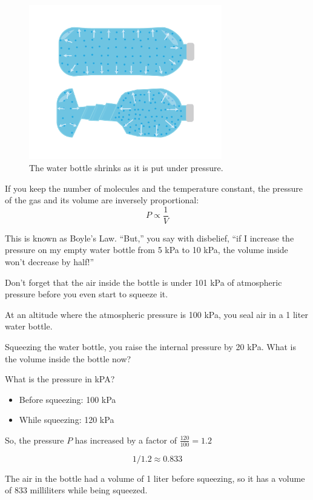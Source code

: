\begin{figure}[htbp]
    \centering
    \includegraphics[width=0.75\textwidth]{waterBottle.png}
    \caption{The water bottle shrinks as it is put under pressure.}
    \label{fig:waterBottle}
\end{figure}


If you keep the number of molecules and the temperature constant, the pressure of the gas and its volume are inversely proportional:
$$P \propto \frac{1}{V}$$

This is known as Boyle's Law. ``But,'' you say with disbelief, ``if I increase the pressure on my empty water bottle from 5 kPa to 10 kPa, the volume inside won't decrease by half!''

Don't forget that the air inside the bottle is under 101 kPa of atmospheric pressure before you even start to squeeze it.

\begin{Exercise}[title={Temperature and Volume}, label=temp_vol]
 
At an altitude where the atmospheric pressure is 100 kPa, you seal air in a 1 liter water bottle.

Squeezing the water bottle, you raise the internal pressure by 20 kPa. What is the volume inside the bottle now?

\end{Exercise}
\begin{Answer}[ref=temp_vol]

What is the pressure in kPA? 
\begin{itemize}
\item Before squeezing: 100 kPa
\item While squeezing: 120 kPa
\end{itemize}

So, the pressure $P$ has increased by a factor of $\frac{120}{100} = 1.2$

$$1/1.2 \approx 0.833$$

The air in the bottle had a volume of 1 liter before squeezing, so it has a volume of 833 milliliters while being squeezed.

\end{Answer}

